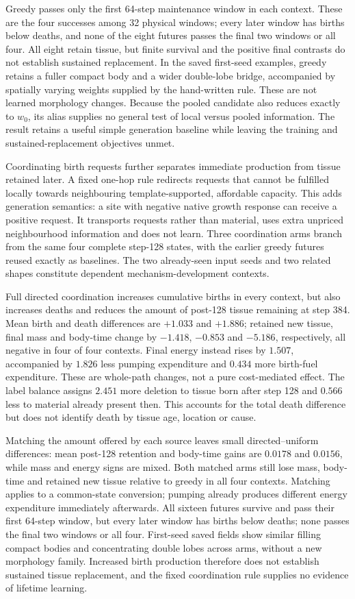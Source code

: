 Greedy passes only the first 64-step maintenance window in each context. These are the four successes among 32 physical windows; every later window has births below deaths, and none of the eight futures passes the final two windows or all four. All eight retain tissue, but finite survival and the positive final contrasts do not establish sustained replacement. In the saved first-seed examples, greedy retains a fuller compact body and a wider double-lobe bridge, accompanied by spatially varying weights supplied by the hand-written rule. These are not learned morphology changes. Because the pooled candidate also reduces exactly to $w_0$, its alias supplies no general test of local versus pooled information. The result retains a useful simple generation baseline while leaving the training and sustained-replacement objectives unmet.

Coordinating birth requests further separates immediate production from tissue retained later. A fixed one-hop rule redirects requests that cannot be fulfilled locally towards neighbouring template-supported, affordable capacity. This adds generation semantics: a site with negative native growth response can receive a positive request. It transports requests rather than material, uses extra unpriced neighbourhood information and does not learn. Three coordination arms branch from the same four complete step-128 states, with the earlier greedy futures reused exactly as baselines. The two already-seen input seeds and two related shapes constitute dependent mechanism-development contexts.

Full directed coordination increases cumulative births in every context, but also increases deaths and reduces the amount of post-128 tissue remaining at step 384. Mean birth and death differences are $+1.033$ and $+1.886$; retained new tissue, final mass and body-time change by $-1.418$, $-0.853$ and $-5.186$, respectively, all negative in four of four contexts. Final energy instead rises by $1.507$, accompanied by $1.826$ less pumping expenditure and $0.434$ more birth-fuel expenditure. These are whole-path changes, not a pure cost-mediated effect. The label balance assigns $2.451$ more deletion to tissue born after step 128 and $0.566$ less to material already present then. This accounts for the total death difference but does not identify death by tissue age, location or cause.

Matching the amount offered by each source leaves small directed--uniform differences: mean post-128 retention and body-time gains are $0.0178$ and $0.0156$, while mass and energy signs are mixed. Both matched arms still lose mass, body-time and retained new tissue relative to greedy in all four contexts. Matching applies to a common-state conversion; pumping already produces different energy expenditure immediately afterwards. All sixteen futures survive and pass their first 64-step window, but every later window has births below deaths; none passes the final two windows or all four. First-seed saved fields show similar filling compact bodies and concentrating double lobes across arms, without a new morphology family. Increased birth production therefore does not establish sustained tissue replacement, and the fixed coordination rule supplies no evidence of lifetime learning.


